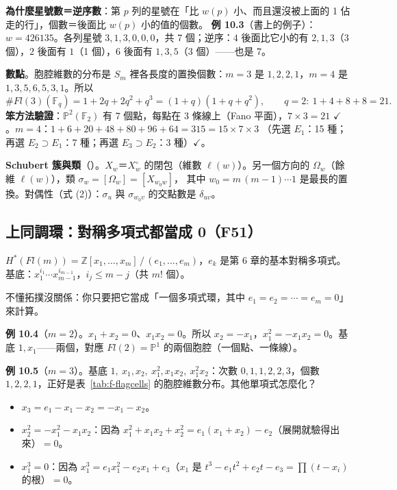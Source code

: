 \textbf{為什麼星號數＝逆序數}：第 $p$ 列的星號在「比 $w(p)$ 小、而且還沒被上面的 1 佔走的行」，個數＝後面比 $w(p)$ 小的值的個數。
\textbf{例 10.3}（書上的例子）：$w=426135$。各列星號 $3,1,3,0,0,0$，共 7 個；逆序：$4$ 後面比它小的有 $2,1,3$（3 個），$2$ 後面有 $1$（1 個），$6$ 後面有 $1,3,5$（3 個）——也是 7。

\textbf{數點}。胞腔維數的分布是 $S_m$ 裡各長度的置換個數：$m=3$ 是 $1,2,2,1$，$m=4$ 是 $1,3,5,6,5,3,1$。所以
\[
\#Fl(3)(\mathbb F_q)=1+2q+2q^2+q^3=(1+q)(1+q+q^2),\qquad q=2:\ 1+4+8+8=21 .
\]
\textbf{笨方法驗證}：$\mathbb P^2(\mathbb F_2)$ 有 7 個點，每點在 3 條線上（Fano 平面），$7\times3=21$ $\checkmark$。$m=4$：$1+6+20+48+80+96+64=315=15\times7\times3$
（先選 $E_1$：15 種；再選 $E_2\supset E_1$：7 種；再選 $E_3\supset E_2$：3 種）$\checkmark$。

\textbf{Schubert 簇與類}（）。$X_w$＝$X^\circ_w$ 的閉包（維數 $\ell(w)$）。另一個方向的 $\Omega_w$（餘維 $\ell(w)$），類 $\sigma_w=[\Omega_w]=[X_{w_0w}]$，
其中 $w_0=m\,(m{-}1)\cdots1$ 是最長的置換。對偶性（式 (2)）：$\sigma_u$ 與 $\sigma_{w_0v}$ 的交點數是 $\delta_{uv}$。

\subsection{上同調環：對稱多項式都當成 0（F51）}\label{sec:f-borel}

\begin{thmbox}[命題 3 \fulref{p.161--162}]
$H^*(Fl(m))=\mathbb Z[x_1,\dots,x_m]\,/\,(e_1,\dots,e_m)$，$e_k$ 是第 6 章的基本對稱多項式。基底：$x_1^{i_1}\cdots x_{m-1}^{i_{m-1}}$，$i_j\le m-j$（共 $m!$ 個）。
\end{thmbox}
不懂拓撲沒關係：你只要把它當成「一個多項式環，其中 $e_1=e_2=\cdots=e_m=0$」來計算。

\textbf{例 10.4}（$m=2$）。$x_1+x_2=0$、$x_1x_2=0$。所以 $x_2=-x_1$，$x_1^2=-x_1x_2=0$。基底 $1,x_1$——兩個，對應 $Fl(2)=\mathbb P^1$ 的兩個胞腔（一個點、一條線）。

\textbf{例 10.5}（$m=3$）。基底 $1,\ x_1,x_2,\ x_1^2,x_1x_2,\ x_1^2x_2$：次數 $0,1,1,2,2,3$，個數 $1,2,2,1$，正好是表~\ref{tab:f-flagcells} 的胞腔維數分布。其他單項式怎麼化？
\begin{itemize}[nosep]
\item $x_3=e_1-x_1-x_2=-x_1-x_2$。
\item $x_2^2=-x_1^2-x_1x_2$：因為 $x_1^2+x_1x_2+x_2^2=e_1(x_1+x_2)-e_2$（展開就驗得出來）$=0$。
\item $x_1^3=0$：因為 $x_1^3=e_1x_1^2-e_2x_1+e_3$（$x_1$ 是 $t^3-e_1t^2+e_2t-e_3=\prod(t-x_i)$ 的根）$=0$。
\end{itemize}

